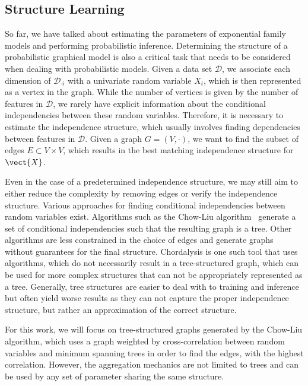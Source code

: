 \subsection{Structure Learning}

So far, we have talked about estimating the parameters of exponential family models and performing probabilistic inference.
Determining the structure of a probabilistic graphical model is also a critical task that needs to be considered when dealing with probabilistic models.
Given a data set $\mathcal{D}$, we associate each dimension of $\mathcal{D}_{\cdot i}$ with a univariate random variable $X_i$, which is then represented as a vertex in the graph.
While the number of vertices is given by the number of features in $\mathcal{D}$, we rarely have explicit information about the conditional independencies between these random variables. 
Therefore, it is necessary to estimate the independence structure, which usually involves finding dependencies between features in $\mathcal{D}$. 
Given a graph $G=(V, \cdot)$, we want to find the subset of edges $E \subset V \times V$, which results in the best matching independence structure for $\vect{X}$.

Even in the case of a predetermined independence structure, we may still aim to either reduce the complexity by removing edges or verify the independence structure.
Various approaches for finding conditional independencies between random variables exist.
Algorithms such as the Chow-Liu algorithm~\cite{chow1968approximating} generate a set of conditional independencies such that the resulting graph is a tree.
Other algorithms are less constrained in the choice of edges and generate graphs without guarantees for the final structure.
Chordalysis is one such tool that uses algorithms, which do not necessarily result in a tree-structured graph, which can be used for more complex structures that can not be appropriately represented as a tree. 
Generally, tree structures are easier to deal with \wrt to training and inference but often yield worse results as they can not capture the proper independence structure, but rather an approximation of the correct structure.

For this work, we will focus on tree-structured graphs generated by the Chow-Liu algorithm, which uses a graph weighted by cross-correlation between random variables and minimum spanning trees in order to find the edges, with the highest correlation.
However, the aggregation mechanics are not limited to trees and can be used by any set of parameter sharing the same structure.

